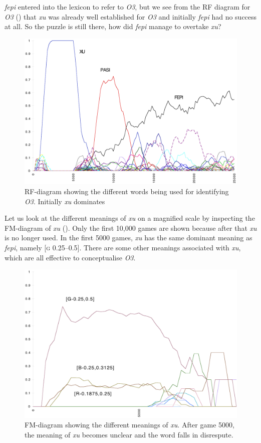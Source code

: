 \textit{fepi} entered into the lexicon to refer to \emph{O3}, but we see
from the RF diagram for \emph{O3} () that 
\textit{xu} was already well established for \emph{O3} and initially 
\textit{fepi} had no success at all. 
So the puzzle is still there, how did \textit{fepi} manage to 
overtake \textit{xu}? 

\begin{figure}[htbp]
  \centerline{\includegraphics[width=.80\textwidth]{chap7/figs/RF-O3.pdf}}
\caption{\label{RF-O3a}RF-diagram showing the different
words being used for identifying \emph{O3}. Initially \textit{xu} 
dominates }
\end{figure}
Let us look at the different meanings of \textit{xu} on 
a magnified scale by 
inspecting the FM-diagram of \textit{xu} (). 
Only the first 10,000 games are shown because after
that \textit{xu} is no longer used. In the first 5000 games,  
\textit{xu} has the same dominant meaning as \textit{fepi}, namely
[\textsc{g} 0.25–0.5]. There are some other meanings 
associated with \textit{xu}, which are all effective 
to conceptualise \emph{O3}.

\begin{figure}[htbp]
  \centerline{\includegraphics[width=.80\textwidth]{chap7/figs/FM-XU.pdf}}
\caption{\label{FM-XU.f}FM-diagram showing the different
meanings of \textit{xu}. After game 5000, the meaning of \textit{xu} becomes
unclear and the word falls in disrespute.}
\end{figure}

